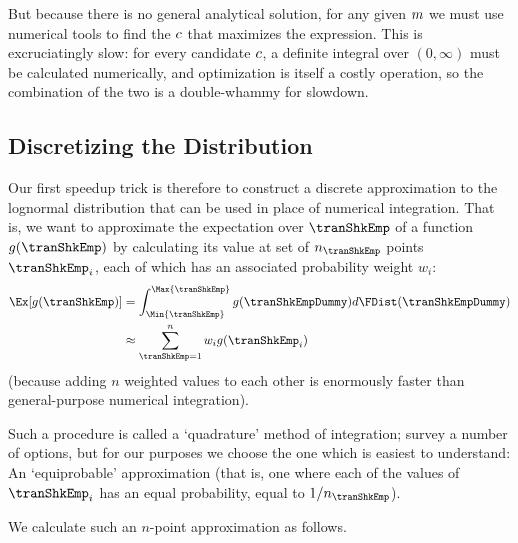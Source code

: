 But because there is no general analytical solution, for any given $m$ we must use numerical tools to find the $c$ that maximizes the expression.  This is excruciatingly slow: for every candidate $c$, a definite integral over $(0,\infty)$ must be calculated numerically, and optimization is itself a costly operation, so the combination of the two is a double-whammy for slowdown.

\hypertarget{discretizing-the-distribution}{}
\subsection{Discretizing the Distribution}
Our first speedup trick is therefore to construct a discrete approximation to the lognormal distribution that can be used in place of numerical integration.  That is, we want to approximate the expectation over $\tranShkEmp$ of a function $g(\tranShkEmp)$ by calculating its value at set of $n_{\tranShkEmp}$ points $\tranShkEmp_{i}$, each of which has an associated probability weight $w_{i}$:
\begin{equation*}\begin{gathered}\begin{aligned}
      \Ex[g(\tranShkEmp)] & = \int_{\Min{\tranShkEmp}}^{\Max{\tranShkEmp}}g(\tranShkEmpDummy)d\FDist(\tranShkEmpDummy) \\
      & \approx \sum_{\tranShkEmp = 1}^{n}w_{i}g(\tranShkEmp_{i})
    \end{aligned}\end{gathered}\end{equation*}
(because adding $n$ weighted values to each other is enormously faster than general-purpose numerical integration).

Such a procedure is called a `quadrature' method of integration; \cite{Tanaka2013-bc} survey a number of options, but for our purposes we choose the one which is easiest to understand: An `equiprobable' approximation (that is, one where each of the values of $\tranShkEmp_{i}$ has an equal probability, equal to $1/n_{\tranShkEmp}$).

We calculate such an $n$-point approximation as follows.

